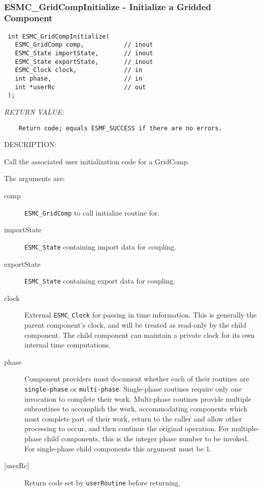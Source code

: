 \mbox{}\hrulefill\ 
 
\subsubsection [ESMC\_GridCompInitialize] {ESMC\_GridCompInitialize - Initialize a Gridded Component}


  
\begin{verbatim} int ESMC_GridCompInitialize(
   ESMC_GridComp comp,           // inout
   ESMC_State importState,       // inout
   ESMC_State exportState,       // inout 
   ESMC_Clock clock,             // in
   int phase,                    // in
   int *userRc                   // out
 );\end{verbatim}{\em RETURN VALUE:}
\begin{verbatim}    Return code; equals ESMF_SUCCESS if there are no errors.\end{verbatim}
{\sf DESCRIPTION:\\ }


  
    Call the associated user initialization code for a GridComp.
  
    The arguments are:
    \begin{description}
    \item[comp]
      {\tt ESMC\_GridComp} to call initialize routine for.
    \item[importState]
      {\tt ESMC\_State} containing import data for coupling.
    \item[exportState]
      {\tt ESMC\_State} containing export data for coupling.
    \item[clock]
      External {\tt ESMC\_Clock} for passing in time information. This is 
      generally the parent component's clock, and will be treated as read-only
      by the child component. The child component can maintain a private clock
      for its own internal time computations.
    \item[phase]
      Component providers must document whether each of their routines are 
      {\tt single-phase} or {\tt multi-phase}. Single-phase routines require 
      only one invocation to complete their work. Multi-phase routines provide
      multiple subroutines to accomplish the work, accommodating components
      which must complete part of their work, return to the caller and allow 
      other processing to occur, and then continue the original operation. 
      For multiple-phase child components, this is the integer phase number to
      be invoked. For single-phase child components this argument must be 1.
    \item[{[userRc]}]
      Return code set by {\tt userRoutine} before returning.
    \end{description}
   
